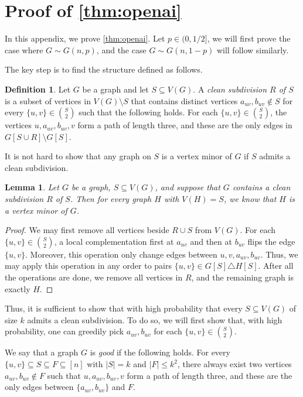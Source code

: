 \documentclass[reqno]{amsart}
\newtheorem{lemma}[theorem]{Lemma}
\theoremstyle{definition}
\newtheorem{definition}[theorem]{Definition}
\numberwithin{theorem}{section}
\renewcommand{\le}{\leqslant}
\newcommand{\abs}[1]{\left|#1\right|}
\begin{document}
\printbibliography
\appendix
\section{Proof of \cref{thm:openai}}\label{appendix:openai}
In this appendix, we prove \cref{thm:openai}. Let $p\in (0,1/2]$, we will first prove the case where $G\sim G(n,p)$, and the case $G\sim G(n,1-p)$ will follow similarly.

The key step is to find the structure defined as follows.

\begin{definition}
Let $G$ be a graph and let $S \subseteq V(G)$.  A \emph{clean subdivision $R$ of $S$}
is a subset of vertices in $V(G)\setminus S$ that contains distinct vertices $a_{uv}, b_{uv}\notin S$ for every $\{u,v\} \in \binom{S}{2}$ such that the following holds. For each $\{u,v\} \in \binom{S}{2}$, the vertices $u,a_{uv},b_{uv},v$ form a path of length three, and these are the only edges in $G[S\cup R]\setminus G[S]$.
\end{definition}

It is not hard to show that any graph on $S$ is a vertex minor of $G$ if $S$ admits a clean subdivision.
\begin{lemma}
\label{lem:toggling}
Let $G$ be a graph, $S\subseteq V(G)$, and suppose that $G$ contains a clean subdivision $R$ of $S$. Then for every graph $H$ with $V(H)=S$, we know that $H$ is a vertex minor of $G$.
\end{lemma}
\begin{proof}
We may first remove all vertices beside $R\cup S$ from $V(G)$.
For each $\{u,v\} \in \binom{S}{2}$, a local
complementation first at $a_{uv}$ and then at $b_{uv}$ flips the edge $\{u,v\}$. Moreover, this operation only change edges between $u,v,a_{uv},b_{uv}$. Thus, we may apply this operation in any order to pairs $\{u,v\} \in G[S]\triangle H[S]$. After all the operations are done, we remove all vertices in $R$, and the remaining graph is exactly $H$.
\end{proof}

Thus, it is sufficient to show that with high probability that every $S\subseteq V(G)$ of size $k$ admits a clean subdivision. To do so, we will first show that, with high probability, one can greedily pick $a_{uv},b_{uv}$ for each $\{u,v\}\in \binom{S}{2}$.

We say that a graph $G$ is \emph{good} if the following holds. For every $\{u,v\}\subseteq S \subseteq F \subseteq [n]$ with $\abs{S}=k$ and $|F| \le k^2$, there always exist two vertices $a_{uv},b_{uv}\notin F$ such that $u,a_{uv},b_{uv},v$ form a path of length three, and these are the only edges between $\{a_{uv},b_{uv}\}$ and $F$.
\end{document}
